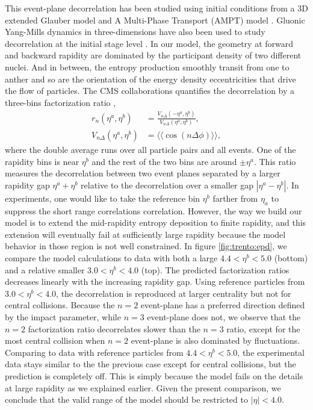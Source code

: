 This event-plane decorrelation has been studied using initial conditions from a 3D extended Glauber model \cite{Bozek:2015bna} and A Multi-Phase Transport (AMPT) model \cite{Jia:2014ysa, Xiao:2012uw,Pang:2015zrq}.
Gluonic Yang-Mills dynamics in three-dimensions have also been used to study decorrelation at the initial stage level \cite{Schenke:2016ksl}.
In our model, the geometry at forward and backward rapidity are dominated by the participant density of two different nuclei.
And in between, the entropy production smoothly transit from one to anther and so are the orientation of the energy density eccentricities that drive the flow of particles.
The CMS collaborations quantifies the decorrelation by a three-bins factorization ratio \cite{Khachatryan:2015oea},
\begin{eqnarray}
r_n(\eta^a, \eta^b) &= \frac{V_{n\Delta}(-\eta^a, \eta^b)}{V_{n\Delta}(\eta^a, \eta^b)}, \\
V_{n\Delta}(\eta^a, \eta^b) &= \langle\langle \cos(n\Delta\phi) \rangle\rangle,
\end{eqnarray}
where the double average runs over all particle pairs and all events.
One of the rapidity bins is near $\eta^b$ and the rest of the two bins are around $\pm\eta^a$.
This ratio measures the decorrelation between two event planes separated by a larger rapidity gap $\eta^a + \eta^b$ relative to the decorrelation over a smaller gap $|\eta^a - \eta^b|$.
In experiments, one would like to take the reference bin $\eta^b$ farther from $\eta_a$ to suppress the short range correlations correlation.
However, the way we build our model is to extend the mid-rapidity entropy deposition to finite rapidity, and this extension will eventually fail at sufficiently large rapidity because the model behavior in those region is not well constrained.
In figure \ref{fig:trento:epd}, we compare the model calculations to data with both a large $4.4<\eta^b<5.0$ (bottom) and a relative smaller $3.0 < \eta^b< 4.0$ (top).
The predicted factorization ratios decreases linearly with the increasing rapidity gap.
Using reference particles from $3.0 < \eta^b< 4.0$, the decorrelation is reproduced at larger centrality but not for central collisions.
Because the $n=2$ event-plane has a preferred direction defined by the impact parameter, while $n=3$ event-plane does not, we observe that the $n=2$ factorization ratio decorrelates slower than the $n=3$ ratio, except for the most central collision when $n=2$ event-plane is also dominated by fluctuations.
Comparing to data with reference particles from $4.4<\eta^b<5.0$, the experimental data stays similar to the the previous case except for central collisions, but the prediction is completely off.
This is simply because the model fails on the details at large rapidity as we explained earlier.
Given the present comparison, we conclude that the valid range of the model should be restricted to $|\eta| < 4.0$.

